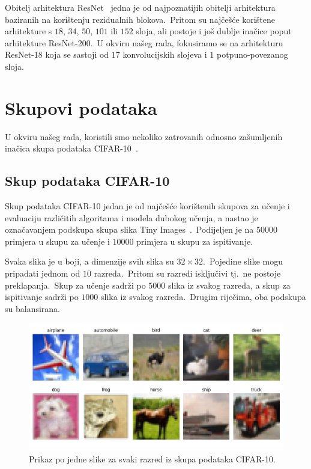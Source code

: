 \documentclass[diplomskirad]{fer}
\begin{document}
Obitelj arhitektura ResNet~\cite{he2016deep} jedna je od najpoznatijih obitelji arhitektura baziranih na korištenju rezidualnih blokova.\ 
Pritom su najčešće korištene arhitekture s $18$, $34$, $50$, $101$ ili $152$ sloja, ali postoje i još dublje inačice poput arhitekture ResNet-200.\ 
U okviru našeg rada, fokusiramo se na arhitekturu ResNet-18 koja se sastoji od $17$ konvolucijskih slojeva i $1$ potpuno-povezanog sloja.\ 

\chapter{Skupovi podataka}
\label{pog:skup}

U okviru našeg rada, koristili smo nekoliko zatrovanih odnosno zašumljenih inačica skupa podataka CIFAR-10~\cite{krizhevsky2009learning}.\

\section{Skup podataka CIFAR-10}
\label{sek:cifar10}

Skup podataka CIFAR-10 jedan je od najčešće korištenih skupova za učenje i evaluaciju različitih algoritama i modela dubokog učenja, a nastao je označavanjem podskupa skupa slika Tiny Images~\cite{krizhevsky2009learning}.\
Podijeljen je na $50 000$ primjera u skupu za učenje i $10 000$ primjera u skupu za ispitivanje.\ 
  
Svaka slika je u boji, a dimenzije svih slika su $32 \times 32$.\ Pojedine slike mogu pripadati jednom od $10$ razreda.\ Pritom su razredi isključivi tj.\ ne postoje preklapanja.\ 
Skup za učenje sadrži po $5000$ slika iz svakog razreda, a skup za ispitivanje sadrži po $1000$ slika iz svakog razreda.\ Drugim riječima, oba podskupa su balansirana.\ 

\begin{figure}[h]
  \centering
  \includegraphics[scale=0.6]{./Slike/cifar10.png}
  \caption{Prikaz po jedne slike za svaki razred iz skupa podataka CIFAR-10.}
  \label{fig:cifar10}
\end{figure}
\end{document}
